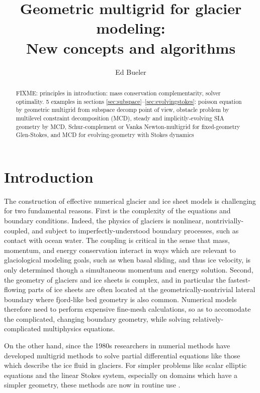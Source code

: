 \documentclass[letterpaper,final,12pt,reqno]{amsart}
\theoremstyle{claim}
\numberwithin{equation}{section}
\numberwithin{figure}{section}
\numberwithin{table}{section}
\numberwithin{theorem}{section}
\begin{document}
\title[Geometric multigrid for glacier modeling]{Geometric multigrid for glacier modeling: \\ New concepts and algorithms}

\author{Ed Bueler}

\begin{abstract} FIXME: principles in introduction: mass conservation complementarity, solver optimality.  5 examples in sections \ref{sec:subspace}--\ref{sec:evolvingstokes}: poisson equation by geometric multigrid from subspace decomp point of view, obstacle problem by multilevel constraint decomposition (MCD), steady and implicitly-evolving SIA geometry by MCD, Schur-complement or Vanka Newton-multigrid for fixed-geometry Glen-Stokes, and MCD for evolving-geometry with Stokes dynamics
\end{abstract}

\maketitle

\tableofcontents

\thispagestyle{empty}

\section{Introduction} \label{sec:intro}

The construction of effective numerical glacier and ice sheet models is challenging for two fundamental reasons.  First is the complexity of the equations and boundary conditions.  Indeed, the physics of glaciers is nonlinear, nontrivially-coupled, and subject to imperfectly-understood boundary processes, such as contact with ocean water.  The coupling is critical in the sense that mass, momentum, and energy conservation interact in ways which are relevant to glaciological modeling goals, such as when basal sliding, and thus ice velocity, is only determined though a simultaneous momentum and energy solution.  Second, the geometry of glaciers and ice sheets is complex, and in particular the fastest-flowing parts of ice sheets are often located at the geometrically-nontrivial lateral boundary where fjord-like bed geometry is also common.  Numerical models therefore need to perform expensive fine-mesh calculations, so as to accomodate the complicated, changing boundary geometry, while solving relatively-complicated multiphysics equations.

On the other hand, since the 1980s researchers in numerial methods have developed multigrid methods to solve partial differential equations like those which describe the ice fluid in glaciers.   For simpler problems like scalar elliptic equations and the linear Stokes system, especially on domains which have a simpler geometry, these methods are now in routine use \cite{Briggsetal2000,Bueler2021,Trottenbergetal2001}.
\end{document}
